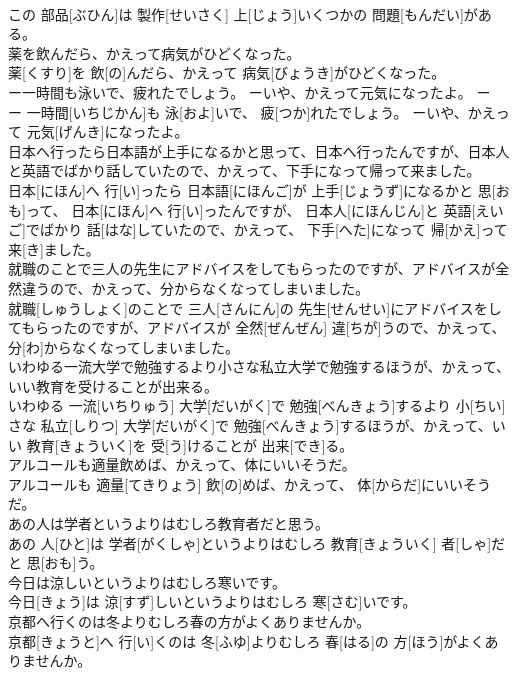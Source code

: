 \documentclass[8pt]{extreport}
\begin{document}
\begin{CJK}{UTF8}{min}
\\	この 部品[ぶひん]は 製作[せいさく] 上[じょう]いくつかの 問題[もんだい]がある。
\\	薬を飲んだら、かえって病気がひどくなった。	
\\	薬[くすり]を 飲[の]んだら、かえって 病気[びょうき]がひどくなった。
\\	ー一時間も泳いで、疲れたでしょう。 ーいや、かえって元気になったよ。	ー
\\	ー 一時間[いちじかん]も 泳[およ]いで、 疲[つか]れたでしょう。 ーいや、かえって 元気[げんき]になったよ。
\\	日本へ行ったら日本語が上手になるかと思って、日本へ行ったんですが、日本人と英語でばかり話していたので、かえって、下手になって帰って来ました。	
\\	日本[にほん]へ 行[い]ったら 日本語[にほんご]が 上手[じょうず]になるかと 思[おも]って、 日本[にほん]へ 行[い]ったんですが、 日本人[にほんじん]と 英語[えいご]でばかり 話[はな]していたので、かえって、 下手[へた]になって 帰[かえ]って 来[き]ました。
\\	就職のことで三人の先生にアドバイスをしてもらったのですが、アドバイスが全然違うので、かえって、分からなくなってしまいました。	
\\	就職[しゅうしょく]のことで 三人[さんにん]の 先生[せんせい]にアドバイスをしてもらったのですが、アドバイスが 全然[ぜんぜん] 違[ちが]うので、かえって、 分[わ]からなくなってしまいました。
\\	いわゆる一流大学で勉強するより小さな私立大学で勉強するほうが、かえって、いい教育を受けることが出来る。	
\\	いわゆる 一流[いちりゅう] 大学[だいがく]で 勉強[べんきょう]するより 小[ちい]さな 私立[しりつ] 大学[だいがく]で 勉強[べんきょう]するほうが、かえって、いい 教育[きょういく]を 受[う]けることが 出来[でき]る。
\\	アルコールも適量飲めば、かえって、体にいいそうだ。	
\\	アルコールも 適量[てきりょう] 飲[の]めば、かえって、 体[からだ]にいいそうだ。
\\	あの人は学者というよりはむしろ教育者だと思う。	
\\	あの 人[ひと]は 学者[がくしゃ]というよりはむしろ 教育[きょういく] 者[しゃ]だと 思[おも]う。
\\	今日は涼しいというよりはむしろ寒いです。	
\\	今日[きょう]は 涼[すず]しいというよりはむしろ 寒[さむ]いです。
\\	京都へ行くのは冬よりむしろ春の方がよくありませんか。	
\\	京都[きょうと]へ 行[い]くのは 冬[ふゆ]よりむしろ 春[はる]の 方[ほう]がよくありませんか。

\end{CJK}
\end{document}
